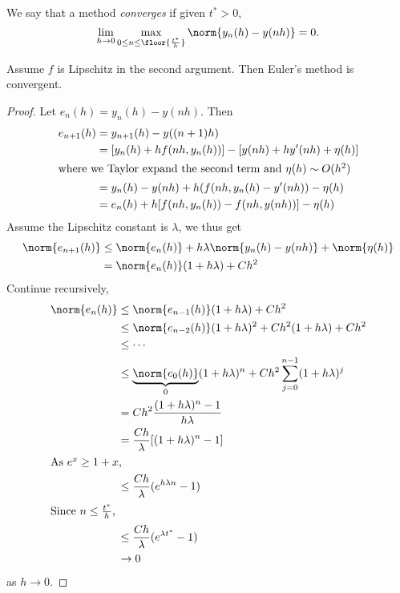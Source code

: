 \documentclass[a4paper]{article}
\begin{document}
\begin{definition}
  We say that a method \emph{converges} if given \(t^* > 0\),
  \[
    \lim_{h \to 0} \max_{0 \leq n \leq \floor{\frac{t^*}{h}}} \norm{y_n(h) - y(nh)} = 0.
  \]
\end{definition}

\begin{theorem}
  Assume \(f\) is Lipschitz in the second argument. Then Euler's method is convergent.
\end{theorem}

\begin{proof}
  Let \(e_n(h) = y_n(h) - y(nh)\). Then
  \begin{align*}
    e_{n + 1}(h)
    &= y_{n + 1}(h) - y((n + 1)h) \\
    &= [y_n(h) + h f(nh, y_n(h))] - [y(nh) + hy'(nh) + \eta(h)] \\
    \intertext{where we Taylor expand the second term and \(\eta(h) \sim O(h^2)\)}
    &= y_n(h) - y(nh) + h(f(nh, y_n(h) - y'(nh)) - \eta(h) \\
    &= e_n(h) + h[f(nh, y_n(h)) - f(nh, y(nh))] - \eta(h)
  \end{align*}
  Assume the Lipschitz constant is \(\lambda\), we thus get
  \begin{align*}
    \norm{e_{n + 1}(h)}
    &\leq \norm{e_n(h)} + h\lambda \norm{y_n(h) - y(nh)} + \norm{\eta(h)} \\
    &= \norm{e_n(h)}(1 + h\lambda) + Ch^2
  \end{align*}
  Continue recursively,
  \begin{align*}
    \norm{e_n(h)}
    &\leq \norm{e_{n - 1}(h)}(1 + h\lambda) + Ch^2 \\
    &\leq \norm{e_{n - 2}(h)}(1 + h\lambda)^2 + Ch^2(1 + h\lambda) + Ch^2 \\
    &\leq \cdots \\
    &\leq \underbrace{\norm{e_0(h)}}_0 (1 + h\lambda)^n + Ch^2 \sum_{j = 0}^{n - 1} (1 + h\lambda)^j \\
    &= Ch^2 \frac{(1 + h\lambda)^n - 1}{h\lambda} \\
    &= \frac{Ch}{\lambda} [(1 + h\lambda)^n - 1] \\
    \intertext{As \(e^x \geq 1 + x\),}
    &\leq \frac{Ch}{\lambda} (e^{h\lambda n} - 1) \\
    \intertext{Since \(n \leq \frac{t^*}{h}\),}
    &\leq \frac{Ch}{\lambda}(e^{\lambda t^*} - 1) \\
    &\to 0
  \end{align*}
  as \(h \to 0\).
\end{proof}
\end{document}
